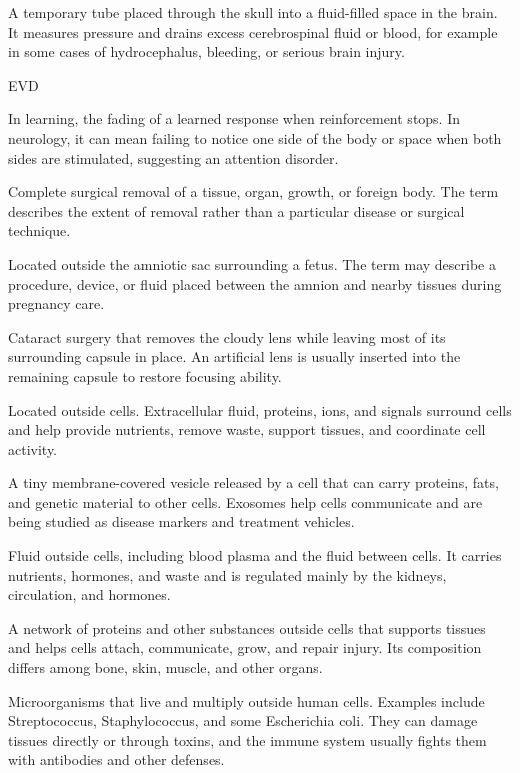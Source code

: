  A temporary tube placed through the skull into a fluid-filled space in the brain. It measures pressure and drains excess cerebrospinal fluid or blood, for example in some cases of hydrocephalus, bleeding, or serious brain injury.

\synonyms
EVD

 In learning, the fading of a learned response when reinforcement stops. In neurology, it can mean failing to notice one side of the body or space when both sides are stimulated, suggesting an attention disorder.

 Complete surgical removal of a tissue, organ, growth, or foreign body. The term describes the extent of removal rather than a particular disease or surgical technique.

 Located outside the amniotic sac surrounding a fetus. The term may describe a procedure, device, or fluid placed between the amnion and nearby tissues during pregnancy care.

 Cataract surgery that removes the cloudy lens while leaving most of its surrounding capsule in place. An artificial lens is usually inserted into the remaining capsule to restore focusing ability.

 Located outside cells. Extracellular fluid, proteins, ions, and signals surround cells and help provide nutrients, remove waste, support tissues, and coordinate cell activity.

 A tiny membrane-covered vesicle released by a cell that can carry proteins, fats, and genetic material to other cells. Exosomes help cells communicate and are being studied as disease markers and treatment vehicles.

 Fluid outside cells, including blood plasma and the fluid between cells. It carries nutrients, hormones, and waste and is regulated mainly by the kidneys, circulation, and hormones.

 A network of proteins and other substances outside cells that supports tissues and helps cells attach, communicate, grow, and repair injury. Its composition differs among bone, skin, muscle, and other organs.

 Microorganisms that live and multiply outside human cells. Examples include Streptococcus, Staphylococcus, and some Escherichia coli. They can damage tissues directly or through toxins, and the immune system usually fights them with antibodies and other defenses.

